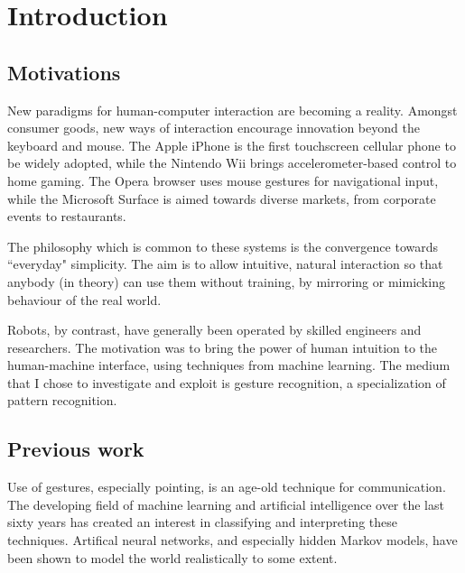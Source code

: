 \documentclass[12pt,a4,notitlepage]{report}
\renewcommand{\_}{\texttt{\symbol{95}}}
\newcommand{\<}{\texttt{\symbol{60}}}
\renewcommand{\>}{\texttt{\symbol{62}}}
\begin{document}
\cleardoublepage

\tableofcontents

\listoffigures


\cleardoublepage        %

\setcounter{page}{1}
\pagestyle{headings}

\chapter{Introduction}

\section{Motivations}
New paradigms for human-computer interaction are becoming a reality. Amongst consumer goods, new ways of interaction encourage innovation beyond the keyboard and mouse. The Apple iPhone is the first touchscreen cellular phone to be widely adopted, while the Nintendo Wii brings accelerometer-based control to home gaming. The Opera browser uses mouse gestures for navigational input, while the Microsoft Surface is aimed towards diverse markets, from corporate events to restaurants.

The philosophy which is common to these systems is the convergence towards ``everyday" simplicity. The aim is to allow intuitive, natural interaction so that anybody (in theory) can use them without training, by mirroring or mimicking behaviour of the real world.

Robots, by contrast, have generally been operated by skilled engineers and researchers. The motivation was to bring the power of human intuition to the human-machine interface, using techniques from machine learning. The medium that I chose to investigate and exploit is gesture recognition, a specialization of pattern recognition.

\section{Previous work}

Use of gestures, especially pointing, is an age-old technique for communication. The developing field of machine learning and artificial intelligence over the last sixty years has created an interest in classifying and interpreting these techniques. Artifical neural networks, and especially hidden Markov models, have been shown to model the world realistically to some extent.
\end{document}
